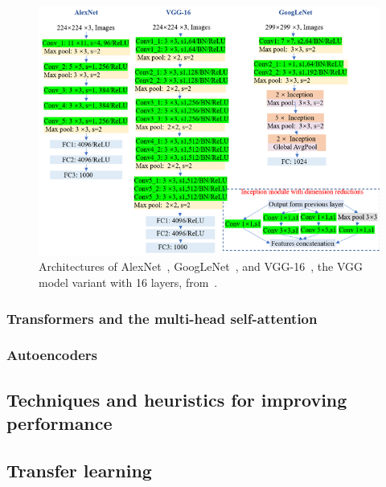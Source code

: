 \documentclass{article}
\begin{document}
\begin{figure}[h]
    \centering
    \includegraphics*[scale=0.6]{../images/famouscnns.png}
    \caption{Architectures of AlexNet~\cite{alexnet}, GoogLeNet~\cite{googlelenet}, and VGG-16~\cite{vgg}, the 
    VGG model variant with 16 layers, from~\cite{zhangImagebasedMethodsDietary2023}.}
    \label{image:famouscnns}
\end{figure}

\subsubsection{Transformers and the multi-head self-attention}

\subsubsection{Autoencoders}

\subsection{Techniques and heuristics for improving performance}
\label{sect:heuristics}

\subsection{Transfer learning}

\end{document}
